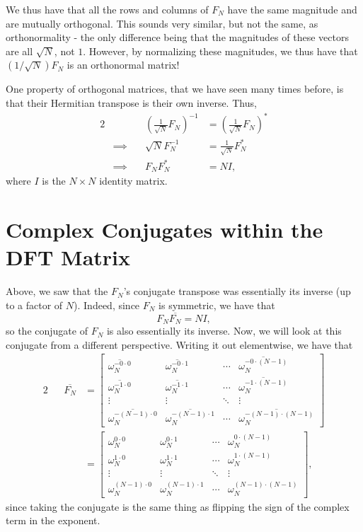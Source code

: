 \documentclass[letterpaper]{article}
\theoremstyle{remark}
\newcommand{\mat}[1]{\ensuremath{\begin{bmatrix}#1\end{bmatrix}}}
\newcommand{\eqn}[1]{\begin{alignat*}{2}#1\end{alignat*}}
\newcommand*{\thus}{&\implies\quad&}
\begin{document}
We thus have that all the rows and columns of $F_N$ have the same magnitude and are mutually orthogonal. This sounds very similar, but not the same, as orthonormality - the only difference being that the magnitudes of these vectors are all $\sqrt{N}$, not $1$. However, by normalizing these magnitudes, we thus have that $(1/\sqrt{N})F_N$ is an orthonormal matrix!

One property of orthogonal matrices, that we have seen many times before, is that their Hermitian transpose is their own inverse. Thus,
\eqn{
    && \left(\frac{1}{\sqrt{N}} F_N\right)^{-1} &= \left(\frac{1}{\sqrt{N}} F_N\right)^* \\
    \thus \sqrt{N} F_N^{-1} &= \frac{1}{\sqrt{N}} F_N^* \\
    \thus F_NF_N^* &= NI,
}
where $I$ is the $N \times N$ identity matrix.

\section{Complex Conjugates within the DFT Matrix}
Above, we saw that the $F_N$'s conjugate transpose was essentially its inverse (up to a factor of $N$). Indeed, since $F_N$ is symmetric, we have that
\[
    F_N\overline{F_N} = NI,
\]
so the conjugate of $F_N$ is also essentially its inverse. Now, we will look at this conjugate from a different perspective. Writing it out elementwise, we have that
\eqn{
    && \overline{F_N} &= \mat{
    \overline{\omega_N^{-0 \cdot 0}} & \overline{\omega_N^{-0 \cdot 1}} & \cdots & \overline{\omega_N^{-0 \cdot (N-1)}} \\
    \overline{\omega_N^{-1 \cdot 0}} & \overline{\omega_N^{-1 \cdot 1}} & \cdots & \overline{\omega_N^{-1 \cdot (N-1)}} \\
    \vdots & \vdots & \ddots & \vdots \\
    \overline{\omega_N^{-(N-1) \cdot 0}} & \overline{\omega_N^{-(N-1) \cdot 1}} & \cdots & \overline{\omega_N^{-(N-1) \cdot (N-1)}}} \\
    &&&= \mat{
    \omega_N^{0 \cdot 0} & \omega_N^{0 \cdot 1} & \cdots & \omega_N^{0 \cdot (N-1)} \\
    \omega_N^{1 \cdot 0} & \omega_N^{1 \cdot 1} & \cdots & \omega_N^{1 \cdot (N-1)} \\
    \vdots & \vdots & \ddots & \vdots \\
    \omega_N^{(N-1) \cdot 0} & \omega_N^{(N-1) \cdot 1} & \cdots & \omega_N^{(N-1) \cdot (N-1)}},
}
since taking the conjugate is the same thing as flipping the sign of the complex term in the exponent.
\end{document}
